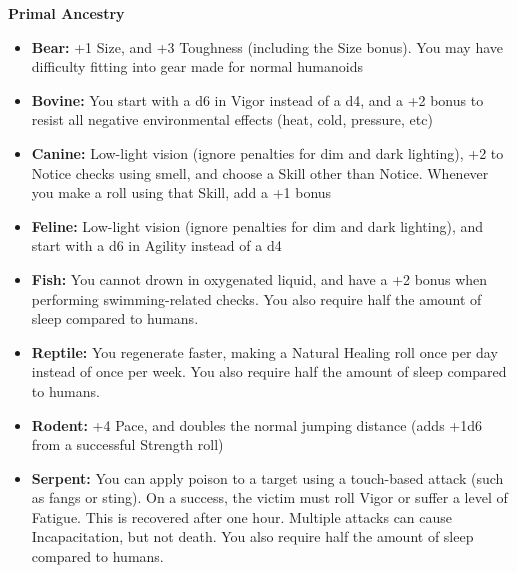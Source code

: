 \textbf{Primal Ancestry}
\begin{itemize}
    \item \textbf{Bear:} +1 Size, and +3 Toughness (including the Size bonus). You may have difficulty fitting into gear made for normal humanoids
    \item \textbf{Bovine:} You start with a d6 in Vigor instead of a d4, and a +2 bonus to resist all negative environmental effects (heat, cold, pressure, etc)
    \item \textbf{Canine:} Low-light vision (ignore penalties for dim and dark lighting), +2 to Notice checks using smell, and choose a Skill other than Notice. Whenever you make a roll using that Skill, add a +1 bonus
    \item \textbf{Feline:} Low-light vision (ignore penalties for dim and dark lighting), and start with a d6 in Agility instead of a d4
    \item \textbf{Fish:} You cannot drown in oxygenated liquid, and have a +2 bonus when performing swimming-related checks. You also require half the amount of sleep compared to humans.
    \item \textbf{Reptile:} You regenerate faster, making a Natural Healing roll once per day instead of once per week. You also require half the amount of sleep compared to humans.
    \item \textbf{Rodent:} +4 Pace, and doubles the normal jumping distance (adds +1d6 from a successful Strength roll)
    \item \textbf{Serpent:} You can apply poison to a target using a touch-based attack (such as fangs or sting). On a success, the victim must roll Vigor or suffer a level of Fatigue. This is recovered after one hour. Multiple attacks can cause Incapacitation, but not death. You also require half the amount of sleep compared to humans.
\end{itemize} 

